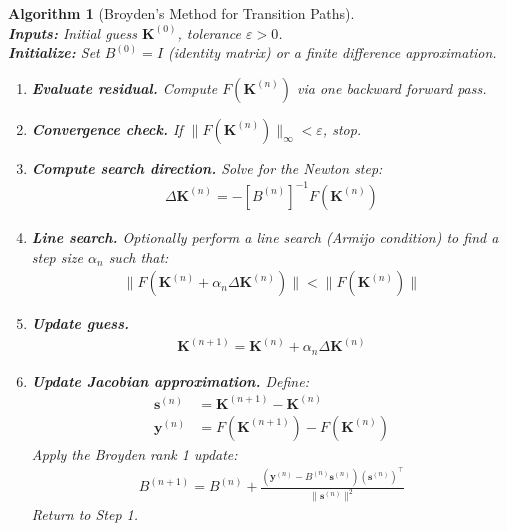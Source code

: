 \documentclass[12pt]{article}
\newtheorem{algorithm_env}{Algorithm}
\begin{document}
\begin{algorithm_env}[Broyden's Method for Transition Paths]
\label{algo:broyden}
\mbox{} \\
\textbf{Inputs:} Initial guess $\mathbf{K}^{(0)}$, tolerance $\varepsilon > 0$. \\[6pt]
\textbf{Initialize:} Set $B^{(0)} = I$ (identity matrix) or a finite difference approximation.
\begin{enumerate}[label=\textbf{Step \arabic*.}, leftmargin=2.5cm]
    \item \textbf{Evaluate residual.} Compute $F(\mathbf{K}^{(n)})$ via one backward forward pass.

    \item \textbf{Convergence check.} If $\|F(\mathbf{K}^{(n)})\|_\infty < \varepsilon$, stop.

    \item \textbf{Compute search direction.} Solve for the Newton step:
    \begin{align}
        \Delta \mathbf{K}^{(n)} = -\left[B^{(n)}\right]^{-1} F(\mathbf{K}^{(n)}) \label{eq:broyden_step}
    \end{align}

    \item \textbf{Line search.} Optionally perform a line search (Armijo condition) to find a step size $\alpha_n$ such that:
    \begin{align*}
        \|F(\mathbf{K}^{(n)} + \alpha_n \Delta \mathbf{K}^{(n)})\| < \|F(\mathbf{K}^{(n)})\|
    \end{align*}

    \item \textbf{Update guess.}
    \begin{align*}
        \mathbf{K}^{(n+1)} = \mathbf{K}^{(n)} + \alpha_n \Delta \mathbf{K}^{(n)}
    \end{align*}

    \item \textbf{Update Jacobian approximation.} Define:
    \begin{align*}
        \mathbf{s}^{(n)} &= \mathbf{K}^{(n+1)} - \mathbf{K}^{(n)} \\
        \mathbf{y}^{(n)} &= F(\mathbf{K}^{(n+1)}) - F(\mathbf{K}^{(n)})
    \end{align*}
    Apply the Broyden rank 1 update:
    \begin{align}
        B^{(n+1)} = B^{(n)} + \frac{(\mathbf{y}^{(n)} - B^{(n)} \mathbf{s}^{(n)}) (\mathbf{s}^{(n)})^\top}{\|\mathbf{s}^{(n)}\|^2} \label{eq:broyden_update}
    \end{align}
    Return to Step 1.
\end{enumerate}
\end{algorithm_env}
\end{document}
